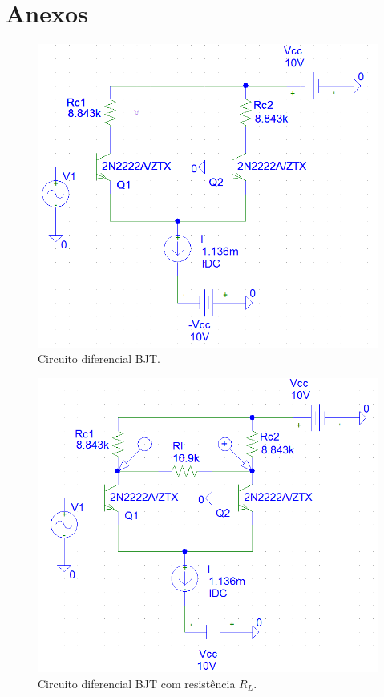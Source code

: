 \documentclass[12pt, a4paper]{article}
\begin{document}
    \newpage
    \section*{Anexos}
    
    \begin{figure}[h!] 
        \centering
        \includegraphics[width=0.40\textheight]{circ41}
        \caption{Circuito diferencial BJT.}        
        \label{circ41}
    \end{figure}
    
    \begin{figure}[h!] 
        \centering
        \includegraphics[width=0.40\textheight]{circ412}
        \caption{Circuito diferencial BJT com resistência \(R_L\).}        
        \label{circ412}
    \end{figure}
    
\end{document}
